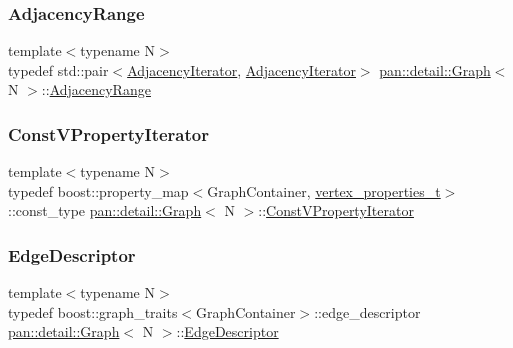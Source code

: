 \mbox{\label{classpan_1_1detail_1_1_graph_abcc5afe3ac75ffca9c7d845a1a2217a5}} 
\subsubsection{\texorpdfstring{Adjacency\+Range}{AdjacencyRange}}
{\footnotesize\ttfamily template$<$typename N$>$ \\
typedef std\+::pair$<$\hyperlink{classpan_1_1detail_1_1_graph_a3cec4963078d7a19e05fbd038525ac17}{Adjacency\+Iterator}, \hyperlink{classpan_1_1detail_1_1_graph_a3cec4963078d7a19e05fbd038525ac17}{Adjacency\+Iterator}$>$ \hyperlink{classpan_1_1detail_1_1_graph}{pan\+::detail\+::\+Graph}$<$ N $>$\+::\hyperlink{classpan_1_1detail_1_1_graph_abcc5afe3ac75ffca9c7d845a1a2217a5}{Adjacency\+Range}}

\mbox{\label{classpan_1_1detail_1_1_graph_a4ae877190ca2507e8c2f557b5cdaf759}} 
\subsubsection{\texorpdfstring{Const\+V\+Property\+Iterator}{ConstVPropertyIterator}}
{\footnotesize\ttfamily template$<$typename N$>$ \\
typedef boost\+::property\+\_\+map$<$Graph\+Container, \hyperlink{_graph_8h_ac353e55313080132b9a44c66de25ab8d}{vertex\+\_\+properties\+\_\+t}$>$\+::const\+\_\+type \hyperlink{classpan_1_1detail_1_1_graph}{pan\+::detail\+::\+Graph}$<$ N $>$\+::\hyperlink{classpan_1_1detail_1_1_graph_a4ae877190ca2507e8c2f557b5cdaf759}{Const\+V\+Property\+Iterator}}

\mbox{\label{classpan_1_1detail_1_1_graph_a21d6fe3d33512e98e8578df1f4d8b810}} 
\subsubsection{\texorpdfstring{Edge\+Descriptor}{EdgeDescriptor}}
{\footnotesize\ttfamily template$<$typename N$>$ \\
typedef boost\+::graph\+\_\+traits$<$Graph\+Container$>$\+::edge\+\_\+descriptor \hyperlink{classpan_1_1detail_1_1_graph}{pan\+::detail\+::\+Graph}$<$ N $>$\+::\hyperlink{classpan_1_1detail_1_1_graph_a21d6fe3d33512e98e8578df1f4d8b810}{Edge\+Descriptor}}

